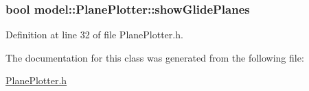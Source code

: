 \subsubsection[{show\+Glide\+Planes}]{\setlength{\rightskip}{0pt plus 5cm}bool model\+::\+Plane\+Plotter\+::show\+Glide\+Planes}\label{classmodel_1_1_plane_plotter_a831a9c44b773ec5e7b9d1910a7f86b79}


Definition at line 32 of file Plane\+Plotter.\+h.



The documentation for this class was generated from the following file\+:\begin{DoxyCompactItemize}
\item 
\hyperlink{_plane_plotter_8h}{Plane\+Plotter.\+h}\end{DoxyCompactItemize}
